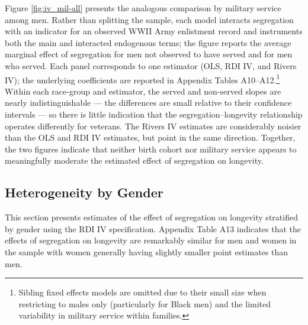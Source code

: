 \documentclass[11pt]{article}
\begin{document}
Figure \ref{fig:iv_mil-all} presents the analogous comparison by military service among men. Rather than splitting the sample, each model interacts segregation with an indicator for an observed WWII Army enlistment record and instruments both the main and interacted endogenous terms; the figure reports the average marginal effect of segregation for men not observed to have served and for men who served. Each panel corresponds to one estimator (OLS, RDI IV, and Rivers IV); the underlying coefficients are reported in Appendix Tables A10--A12.\footnote{Sibling fixed effects models are omitted due to their small size when restricting to males only (particularly for Black men) and the limited variability in military service within families.} Within each race-group and estimator, the served and non-served slopes are nearly indistinguishable --- the differences are small relative to their confidence intervals --- so there is little indication that the segregation--longevity relationship operates differently for veterans. The Rivers IV estimates are considerably noisier than the OLS and RDI IV estimates, but point in the same direction. Together, the two figures indicate that neither birth cohort nor military service appears to meaningfully moderate the estimated effect of segregation on longevity.





\subsection{Heterogeneity by Gender}

This section presents estimates of the effect of segregation on longevity stratified by gender using the RDI IV specification. Appendix Table A13 indicates that the effects of segregation on longevity are remarkably similar for men and women in the sample with women generally having slightly smaller point estimates than men.


\end{document}

